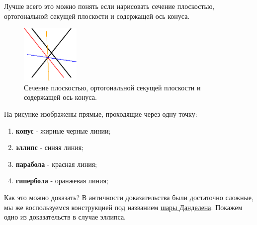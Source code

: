 \documentclass[12pt]{article}
\theoremstyle{definition}
\begin{document}
Лучше всего это можно понять если нарисовать сечение плоскостью, ортогональной секущей плоскости и содержащей ось конуса.
\begin{figure}[H]
	\centering
	\includegraphics[width=0.25\textwidth]{ANGL1_8.eps}
	\caption{Сечение плоскостью, ортогональной секущей плоскости и содержащей ось конуса.}
	\label{1_8}
\end{figure}
На рисунке изображены прямые, проходящие через одну точку: 
\begin{enumerate}[label=\arabic*)]
	\item \textbf{конус} - жирные черные линии;
	\item \textbf{эллипс} - синяя линия;
	\item \textbf{парабола} - красная линия;
	\item \textbf{гипербола} - оранжевая линия;
\end{enumerate}
Как это можно доказать? В античности доказательства были достаточно сложные, мы же воспользуемся конструкцией под названием \uline{шары Данделена}. Покажем одно из доказательств в случае эллипса.

\newpage
\end{document}
